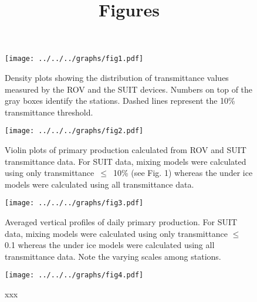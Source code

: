 \documentclass[12pt,a4paper]{scrartcl}
\title{Figures}
\date{}
\begin{document}
\maketitle

\begin{figure}[h]
	\centering
	\texttt{[image: ../../../graphs/fig1.pdf]}
	\caption{Density plots showing the distribution of transmittance values measured by the ROV and the SUIT devices. Numbers on top of the gray boxes identify the stations. Dashed lines represent the 10\% transmittance threshold.}
\end{figure}

\clearpage
\newpage

\begin{figure}[h]
	\centering
	\texttt{[image: ../../../graphs/fig2.pdf]}
	\caption{Violin plots of primary production calculated from ROV and SUIT transmittance data. For SUIT data, mixing models were calculated using only transmittance~$\le$~10\% (see Fig. 1) whereas the under ice models were calculated using all transmittance data.}
\end{figure}

\clearpage
\newpage

\begin{figure}[h]
	\centering
	\texttt{[image: ../../../graphs/fig3.pdf]}
	\caption{Averaged vertical profiles of daily primary production. For SUIT data, mixing models were calculated using only transmittance $\le$ 0.1 whereas the under ice models were calculated using all transmittance data. Note the varying scales among stations.}
\end{figure}

\clearpage
\newpage

\begin{figure}[h]
	\centering
	\texttt{[image: ../../../graphs/fig4.pdf]}
	\caption{xxx}
\end{figure}
\end{document}
